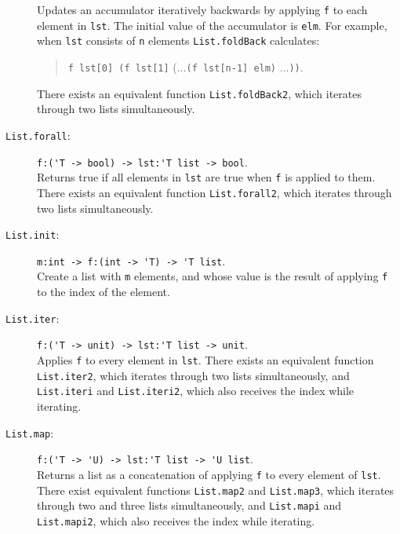 \documentclass[fsharpNotes.tex]{subfiles}
\begin{document}
\begin{description}
  Updates an accumulator iteratively backwards by applying \lstinline{f} to each element in \lstinline{lst}. The initial value of the accumulator is \lstinline{elm}. For example, when \lstinline{lst} consists of \lstinline{n} elements
  \lstinline{List.foldBack} calculates:
  \begin{quote}
    \lstinline{f lst[0] (f lst[1]} ($\ldots$\lstinline{(f lst[n-1] elm)} $\ldots$\lstinline{))}.
  \end{quote}
  There exists an equivalent function \lstinline{List.foldBack2}, which iterates through two lists simultaneously.
\item[\texttt{List.forall}:] \lstinline{f:('T -> bool) -> lst:'T list -> bool}.~\\
  Returns true if all elements in \lstinline{lst} are true when \lstinline{f} is applied to them.
  There exists an equivalent function \lstinline{List.forall2}, which iterates through two lists simultaneously.
\item[\texttt{List.init}:] \lstinline{m:int -> f:(int -> 'T) -> 'T list}.~\\
  Create a list with \lstinline{m} elements, and whose value is the result of applying \lstinline{f} to the index of the element.
\item[\texttt{List.iter}:] \lstinline{f:('T -> unit) -> lst:'T list -> unit}.~\\
  Applies \lstinline{f} to every element in \lstinline{lst}.
  There exists an equivalent function \lstinline{List.iter2}, which iterates through two lists simultaneously, and \lstinline{List.iteri} and \lstinline{List.iteri2}, which also receives the index while iterating.
\item[\texttt{List.map}:] \lstinline{f:('T -> 'U) -> lst:'T list -> 'U list}.~\\
  Returns a list as a concatenation of applying \lstinline{f} to every element of \lstinline{lst}.
  There exist equivalent functions \lstinline{List.map2} and \lstinline{List.map3}, which iterates through two and three lists simultaneously, and \lstinline{List.mapi} and \lstinline{List.mapi2}, which also receives the index while iterating.

\end{description}
\end{document}
